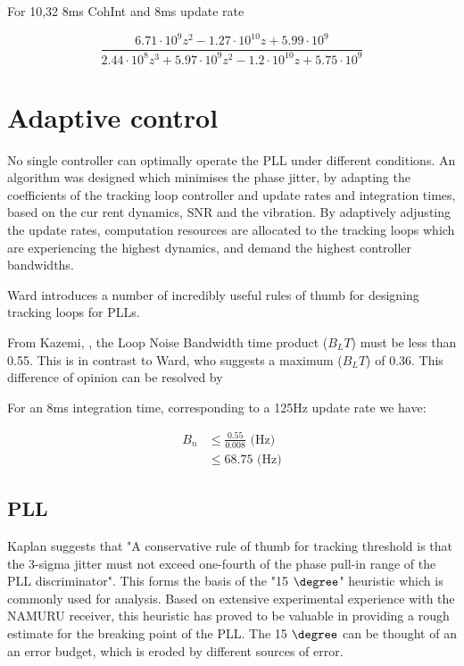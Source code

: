 For 10,32 8ms CohInt and 8ms update rate

\begin{equation}
\frac{6.71 \cdot 10^{9} z^{2} - 1.27 \cdot 10^{10} z + 5.99 \cdot 10^{9}}{2.44 \cdot 10^{8} z^{3} + 5.97 \cdot 10^{9} z^{2} - 1.2 \cdot 10^{10} z + 5.75 \cdot 10^{9}}
\end{equation}


\clearpage


\section{Adaptive control}

No single controller can
optimally operate the PLL
under different conditions.
An algorithm was designed
which minimises the phase
jitter, by adapting the
coefficients of the tracking
loop controller and update
rates and integration times,
based on the cur rent
dynamics, SNR and the
vibration.
By adaptively adjusting the update rates, computation resources
are allocated to the tracking loops which are experiencing the
highest dynamics, and demand the highest controller
bandwidths.


Ward introduces a number of incredibly useful rules of thumb for designing tracking loops for PLLs. 

From Kazemi, \cite{Kazemi2008}, the Loop Noise Bandwidth time product ($B_L T$) must be less than 0.55.
This is in contrast to Ward, who suggests a maximum  ($B_L T$) of 0.36. This difference of opinion can be resolved by 


For an 8ms integration time, corresponding to a 125Hz update rate we have:

\begin{align*}
B_n &\leq \frac{0.55}{0.008} \text{ (Hz)}\\
    &\leq 68.75 \text{ (Hz)}
\end{align*}

\subsection{PLL}
Kaplan suggests that "A conservative rule of thumb for tracking threshold is that the 3-sigma jitter must not exceed one-fourth of the phase pull-in range of the PLL discriminator"\cite{Kaplan}. This forms the basis of the "15 $\degree$" heuristic which is commonly used for analysis. Based on extensive experimental experience with the \ac{NAMURU} receiver, this heuristic has proved to be valuable in providing a rough estimate for the breaking point of the PLL. The 15 $\degree$ can be thought of an an error budget, which is eroded by different sources of error.

